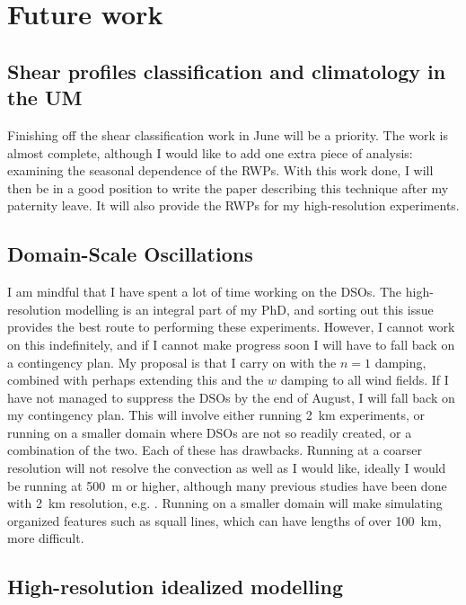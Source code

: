 \documentclass[11pt,a4paper]{article}
\begin{document}
\section{Future work}
\label{sec:Future work}

\subsection{Shear profiles classification and climatology in the UM}
\label{sec:Shear climatology in the UM}

Finishing off the shear classification work in June will be a priority. The work is almost complete, although I would like to add one extra piece of analysis: examining the seasonal dependence of the RWPs. With this work done, I will then be in a good position to write the paper describing this technique after my paternity leave. It will also provide the RWPs for my high-resolution experiments.

\subsection{Domain-Scale Oscillations}
\label{sec:dso_future}
I am mindful that I have spent a lot of time working on the DSOs. The high-resolution modelling is an integral part of my PhD, and sorting out this issue provides the best route to performing these experiments. However, I cannot work on this indefinitely, and if I cannot make progress soon I will have to fall back on a contingency plan. My proposal is that I carry on with the $n = 1$ damping, combined with perhaps extending this and the $w$ damping to all wind fields. If I have not managed to suppress the DSOs by the end of August, I will fall back on my contingency plan. This will involve either running \SI{2}{km} experiments, or running on a smaller domain where DSOs are not so readily created, or a combination of the two. Each of these has drawbacks. Running at a coarser resolution will not resolve the convection as well as I would like, ideally I would be running at \SI{500}{m} or higher, although many previous studies have been done with \SI{2}{km} resolution, e.g. \cite{tompkins2017organization}. Running on a smaller domain will make simulating organized features such as squall lines, which can have lengths of over \SI{100}{km}, more difficult.

\subsection{High-resolution idealized modelling}
\label{sec:High-resolution idealized modelling}
\end{document}
